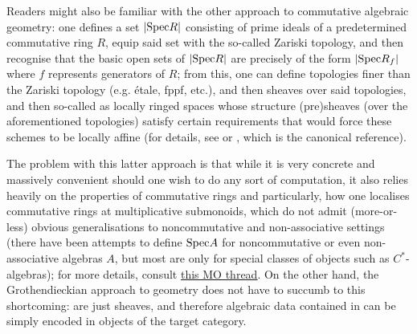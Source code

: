             Readers might also be familiar with the other approach to commutative algebraic geometry: one defines a set $|\mathrm{Spec} R|$ consisting of prime ideals of a predetermined commutative ring $R$, equip said set with the so-called Zariski topology, and then recognise that the basic open sets of $|\mathrm{Spec} R|$ are precisely of the form $|\mathrm{Spec} R_f|$ where $f$ represents generators of $R$; from this, one can define topologies finer than the Zariski topology (e.g. \'etale, fppf, etc.), and then sheaves over said topologies, and then so-called  as locally ringed spaces whose structure (pre)sheaves (over the aforementioned topologies) satisfy certain requirements that would force these schemes to be locally affine (for details, see \cite[Chapter 1]{my_commalg_book} or \cite[Chapter 2]{hartshorne}, which is the canonical reference). 
            
            The problem with this latter approach is that while it is very concrete and massively convenient should one wish to do any sort of computation, it also relies heavily on the properties of commutative rings and particularly, how one localises commutative rings at multiplicative submonoids, which do not admit (more-or-less) obvious generalisations to noncommutative and non-associative settings (there have been attempts to define $\mathrm{Spec} A$ for noncommutative or even non-associative algebras $A$, but most are only  for special classes of objects such as $C^*$-algebras); for more details, consult \href{https://mathoverflow.net/questions/159449/why-is-naive-definition-of-non-commutative-spectrum-bad}{\underline{this MO thread}}. On the other hand, the Grothendieckian approach to geometry does not have to succumb to this shortcoming:  are just sheaves, and therefore algebraic data contained in  can be simply encoded in objects of the target category. 
        
